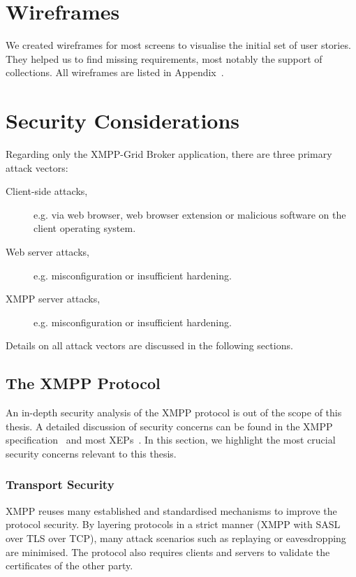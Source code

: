 \section{Wireframes}

We created wireframes for most screens to visualise the initial set of user stories.
They helped us to find missing requirements, most notably the support of collections.
All wireframes are listed in Appendix~.

\section{Security Considerations}\label{sec:security-considerations}

Regarding only the XMPP-Grid Broker application, there are three primary attack vectors:

\begin{description}
    \item[Client-side attacks,] e.g. via web browser, web browser extension or malicious software on the client operating system.
    \item[Web server attacks,] e.g. misconfiguration or insufficient hardening.
    \item[XMPP server attacks,] e.g. misconfiguration or insufficient hardening.
\end{description}

Details on all attack vectors are discussed in the following sections.

\subsection{The XMPP Protocol}

An in-depth security analysis of the XMPP protocol is out of the scope of this thesis.
A detailed discussion of security concerns can be found in the XMPP specification~\cite{rfc6120} and most XEPs~\cite{xep-0060}\cite{xep-0248}.
In this section, we highlight the most crucial security concerns relevant to this thesis.

\subsubsection{Transport Security}

XMPP reuses many established and standardised mechanisms to improve the protocol security.
By layering protocols in a strict manner (XMPP with SASL over TLS over TCP), many attack scenarios such as replaying or eavesdropping are minimised.
The protocol also requires clients and servers to validate the certificates of the other party.~\cite{rfc7590}\cite{rfc6120}

